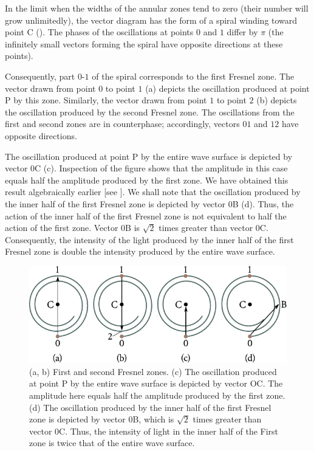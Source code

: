 In the limit when the widths of the annular zones tend to zero (their number will grow unlimitedly), the vector diagram has the form of a spiral winding toward point C ().
The phases of the oscillations at points $0$ and $1$ differ by $\pi$ (the infinitely small vectors forming the spiral have opposite directions at these points).

Consequently, part $0$-$1$ of the spiral corresponds to the first Fresnel zone.
The vector drawn from point $0$ to point $1$ (a) depicts the oscillation produced at point P by this zone.
Similarly, the vector drawn from point $1$ to point $2$ (b) depicts the oscillation produced by the second Fresnel zone.
The oscillations from the first and second zones are in counterphase; accordingly, vectors $01$ and $12$ have opposite directions.

The oscillation produced at point P by the entire wave surface is depicted by vector $0$C (c).
Inspection of the figure shows that the amplitude in this case equals half the amplitude produced
by the first zone.
We have obtained this result algebraically earlier [see ].
We shall note that the oscillation produced by the
inner half of the first Fresnel zone is depicted by vector $0$B (d).
Thus, the action of the inner half of the first Fresnel zone is not equivalent to half the action of the first zone.
Vector $0$B is $\sqrt{2}$ times greater than vector $0$C.
Consequently, the intensity of the light produced by the inner half of the first Fresnel zone is double the intensity produced by the entire wave surface.

\begin{figure}[t]
	\begin{center}
		\includegraphics[scale=0.9]{figures/ch_18/fig_18_8.pdf}
        \caption[]{(a, b) First and second Fresnel zones. (c) The oscillation produced at point P by the entire wave surface is depicted by vector OC. The amplitude here equals half the amplitude produced by the first zone. (d) The oscillation produced by the inner half of the first Fresnel zone is depicted by vector $0$B, which is $\sqrt{2}$ times greater than vector $0$C. Thus, the intensity of light in the inner half of the First zone is twice that of the entire wave surface.}
		\label{fig:18_8}
	\end{center}
	\vspace{-0.8cm}
\end{figure}

